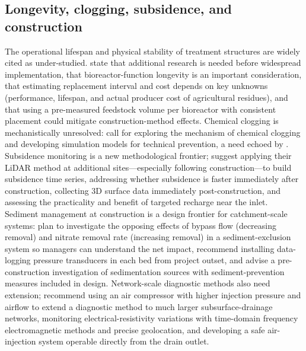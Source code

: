 \documentclass[11pt]{article}
\begin{document}
\subsection{Longevity, clogging, subsidence, and construction}
The operational lifespan and physical stability of treatment structures are widely cited as under-studied. \textcite{Kohn2023} state that additional research is needed before widespread implementation, that bioreactor-function longevity is an important consideration, that estimating replacement interval and cost depends on key unknowns (performance, lifespan, and actual producer cost of agricultural residues), and that using a pre-measured feedstock volume per bioreactor with consistent placement could mitigate construction-method effects. Chemical clogging is mechanistically unresolved: \textcite{Guo2020} call for exploring the mechanism of chemical clogging and developing simulation models for technical prevention, a need echoed by \textcite{Guo2021}. Subsidence monitoring is a new methodological frontier; \textcite{Christianson2025b} suggest applying their LiDAR method at additional sites---especially following construction---to build subsidence time series, addressing whether subsidence is faster immediately after construction, collecting 3D surface data immediately post-construction, and assessing the practicality and benefit of targeted recharge near the inlet. Sediment management at construction is a design frontier for catchment-scale systems: \textcite{Feyereisen2023} plan to investigate the opposing effects of bypass flow (decreasing removal) and nitrate removal rate (increasing removal) in a sediment-exclusion system so managers can understand the net impact, recommend installing data-logging pressure transducers in each bed from project outset, and advise a pre-construction investigation of sedimentation sources with sediment-prevention measures included in design. Network-scale diagnostic methods also need extension; \textcite{Henine2021} recommend using an air compressor with higher injection pressure and airflow to extend a diagnostic method to much larger subsurface-drainage networks, monitoring electrical-resistivity variations with time-domain frequency electromagnetic methods and precise geolocation, and developing a safe air-injection system operable directly from the drain outlet.
\end{document}
